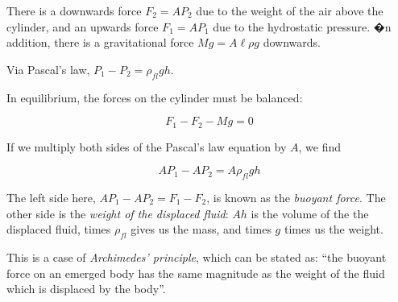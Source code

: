 \begin{figure}[H]
\centering
{}%
\end{figure}



There is a downwards force $F_2 = A P_2$ due to the weight of the air above the cylinder, and an upwards force $F_1 = A P_1$ due to the hydrostatic pressure. �n addition, there is a gravitational force $M g = A \ell \rho g$ downwards.

Via Pascal's law, $P_1 - P_2 = \rho_{fl} g h$.

In equilibrium, the forces on the cylinder must be balanced:

\begin{equation}
F_1 - F_2 - M g = 0
\end{equation}

If we multiply both sides of the Pascal's law equation by $A$, we find

\begin{equation}
A P_1 - A P_2 = A \rho_{fl} g h
\end{equation}

The left side here, $A P_1 - A P_2 = F_1 - F_2$, is known as the \emph{buoyant force}. The other side is the \emph{weight of the displaced fluid}: $A h$ is the volume of the the displaced fluid, times $\rho_{fl}$ gives us the mass, and times $g$ times us the weight.

This is a case of \emph{Archimedes' principle}, which can be stated as: ``the buoyant force on an emerged body has the same magnitude as the weight of the fluid which is displaced by the body''.

